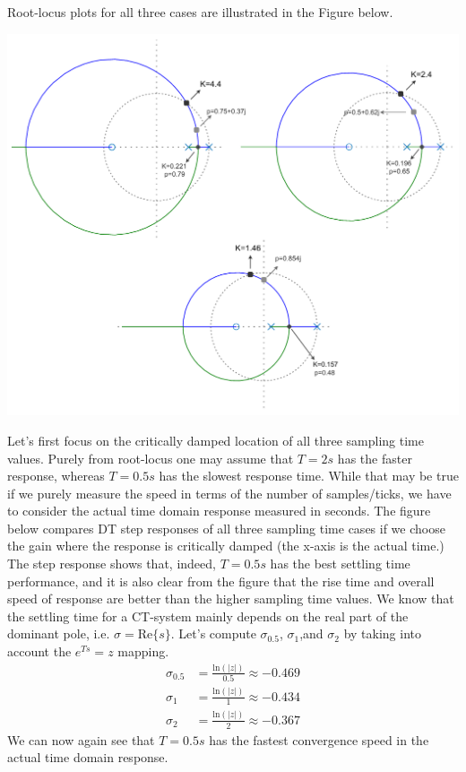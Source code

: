 \documentclass[twoside]{article}
\begin{document}
Root-locus plots for all three cases are illustrated in the Figure
below.

\begin{center}
\begin{minipage}[h]{\linewidth}
    \begin{center}
      \includegraphics[width=\textwidth]{rlocus}
    \end{center}
\end{minipage}
\end{center}

Let's first focus on the critically damped location of all three sampling time values. Purely from root-locus one may assume that $T = 2 s$ has the faster response, whereas $T = 0.5 s$ has the slowest response time. While that may be true if we purely measure the speed in terms of the number of samples/ticks, we have to consider the actual time domain response measured in seconds. The figure below compares DT step responses of all three sampling time cases if we choose the gain where the response is critically damped (the x-axis is the actual time.) The step response shows that, indeed, $T = 0.5 s$ has the best settling time performance, and it is also clear from the figure that the rise time and overall speed of response are better than the higher sampling time values. We know that the settling time for a CT-system mainly depends on the real part of the dominant pole, i.e. $\sigma = \mathrm{Re} \lbrace s \rbrace$. 
Let's compute $\sigma_{0.5}$, $\sigma_{1}$,and $\sigma_2$ by taking 
into account the $e^{Ts} = z$ mapping.
%
\begin{align*}
\sigma_{0.5} &= \frac{\mathrm{ln}(|z|) }{0.5} \approx -0.469
\\
\sigma_{1} &= \frac{\mathrm{ln}(|z|) }{1} \approx -0.434
\\
\sigma_{2} &= \frac{\mathrm{ln}(|z|) }{2} \approx -0.367
\end{align*}
%
We can now again see that $T = 0.5 s$ has the fastest convergence speed in the actual time domain response. 
\end{document}
